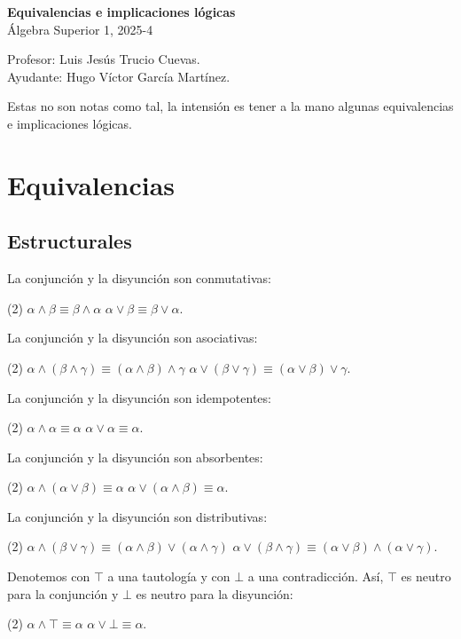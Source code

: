 \documentclass[letterpaper,DIV=12,headsepline,12pt]{scrartcl}
\begin{document}
\thispagestyle{beginstyle}
\begin{center}
  {\fontsize{30}{60}\rmfamily \textbf{Equivalencias e implicaciones lógicas}}
  \\ \vspace{.2cm}
  Álgebra Superior 1, 2025-4
\end{center}
\begin{flushright}
  \footnotesize \hfill Profesor: Luis Jesús Trucio Cuevas.\\
  \hfill Ayudante: Hugo Víctor García Martínez.
\end{flushright}

\noindent
Estas no son notas como tal, la intensión es tener a la mano algunas
equivalencias e implicaciones lógicas.

\section{Equivalencias}
\subsection{Estructurales}
La conjunción y la disyunción son conmutativas:
\begin{tasks}(2)
  \task \(\alpha\land\beta\equiv\beta\land\alpha\)
  \task \(\alpha\lor\beta\equiv\beta\lor\alpha\).
\end{tasks}
%
La conjunción y la disyunción son asociativas:
\begin{tasks}(2)
  \task \(\alpha\land(\beta\land\gamma)\equiv(\alpha\land\beta)\land\gamma\)
  \task \(\alpha\lor(\beta\lor\gamma)\equiv(\alpha\lor\beta)\lor\gamma\).
\end{tasks}
%
La conjunción y la disyunción son idempotentes:
\begin{tasks}(2)
  \task \(\alpha\land\alpha\equiv\alpha\)
  \task \(\alpha\lor\alpha\equiv\alpha\).
\end{tasks}
%
La conjunción y la disyunción son absorbentes:
\begin{tasks}(2)
  \task \(\alpha\land(\alpha\lor\beta)\equiv\alpha\)
  \task \(\alpha\lor(\alpha\land\beta)\equiv\alpha\).
\end{tasks}
%
La conjunción y la disyunción son distributivas:
\begin{tasks}(2)
  \task \(\alpha\land(\beta\lor\gamma)\equiv(\alpha\land\beta)\lor(\alpha\land\gamma)\)
  \task \(\alpha\lor(\beta\land\gamma)\equiv(\alpha\lor\beta)\land(\alpha\lor\gamma)\).
\end{tasks}
%
Denotemos con \(\top\) a una tautología y con \(\bot\) a una contradicción. Así,
\(\top\) es neutro para la conjunción y \(\bot\) es neutro para la disyunción:
\begin{tasks}(2)
  \task \(\alpha\land\top\equiv\alpha\)
  \task \(\alpha\lor\bot\equiv\alpha\).
\end{tasks}
\end{document}

